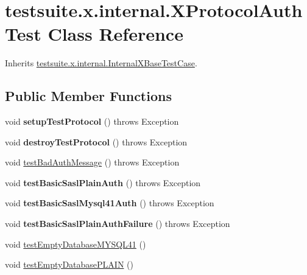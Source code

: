 \hypertarget{classtestsuite_1_1x_1_1internal_1_1_x_protocol_auth_test}{}\section{testsuite.\+x.\+internal.\+X\+Protocol\+Auth\+Test Class Reference}
\label{classtestsuite_1_1x_1_1internal_1_1_x_protocol_auth_test}


Inherits \mbox{\hyperlink{classtestsuite_1_1x_1_1internal_1_1_internal_x_base_test_case}{testsuite.\+x.\+internal.\+Internal\+X\+Base\+Test\+Case}}.

\subsection*{Public Member Functions}
\begin{DoxyCompactItemize}
\item 
\mbox{\label{classtestsuite_1_1x_1_1internal_1_1_x_protocol_auth_test_a57430feba87ab0193bb09121d9ad49a6}} 
void {\bfseries setup\+Test\+Protocol} ()  throws Exception 
\item 
\mbox{\label{classtestsuite_1_1x_1_1internal_1_1_x_protocol_auth_test_a18ba2416ae6c99ffb77b8365f9555a0d}} 
void {\bfseries destroy\+Test\+Protocol} ()  throws Exception 
\item 
void \mbox{\hyperlink{classtestsuite_1_1x_1_1internal_1_1_x_protocol_auth_test_a15c56d0e66e32bb2906ca10e99e87aef}{test\+Bad\+Auth\+Message}} ()  throws Exception 
\item 
\mbox{\label{classtestsuite_1_1x_1_1internal_1_1_x_protocol_auth_test_a535fb0dc31d27ef08facfe31f5969523}} 
void {\bfseries test\+Basic\+Sasl\+Plain\+Auth} ()  throws Exception 
\item 
\mbox{\label{classtestsuite_1_1x_1_1internal_1_1_x_protocol_auth_test_a7b4ee549a5e581fda55eb659d75909b5}} 
void {\bfseries test\+Basic\+Sasl\+Mysql41\+Auth} ()  throws Exception 
\item 
\mbox{\label{classtestsuite_1_1x_1_1internal_1_1_x_protocol_auth_test_a502f91ff41c06ef067fa9845718fe7f5}} 
void {\bfseries test\+Basic\+Sasl\+Plain\+Auth\+Failure} ()  throws Exception 
\item 
void \mbox{\hyperlink{classtestsuite_1_1x_1_1internal_1_1_x_protocol_auth_test_a76e75605e16d62562cc640dee2c1f97f}{test\+Empty\+Database\+M\+Y\+S\+Q\+L41}} ()
\item 
void \mbox{\hyperlink{classtestsuite_1_1x_1_1internal_1_1_x_protocol_auth_test_a0399a6526726159d237bed0441d195c2}{test\+Empty\+Database\+P\+L\+A\+IN}} ()
\end{DoxyCompactItemize}
